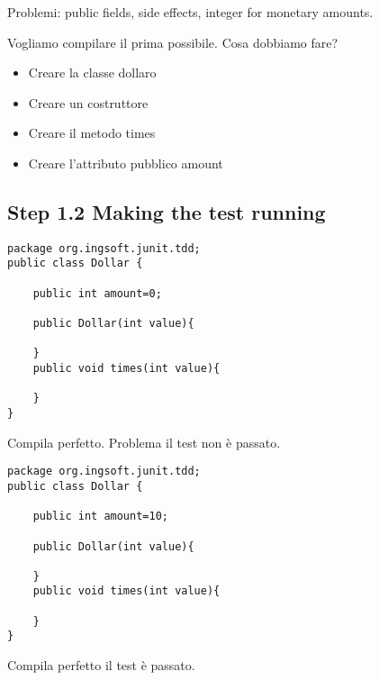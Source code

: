 \documentclass{article}
\begin{document}
Problemi: public fields, side effects, integer for monetary amounts.

Vogliamo compilare il prima possibile. Cosa dobbiamo fare?
\begin{itemize}
\item Creare la classe dollaro
\item Creare un costruttore
\item Creare il metodo times
\item Creare l'attributo pubblico  amount
\end{itemize}

\subsection {Step 1.2 Making the test running}
\begin{lstlisting}
package org.ingsoft.junit.tdd;
public class Dollar {
	
	public int amount=0;
	
	public Dollar(int value){
		
	}
	public void times(int value){
		
	}
}
\end{lstlisting}
Compila perfetto. Problema il test non \`e passato.

\begin{lstlisting}
package org.ingsoft.junit.tdd;
public class Dollar {
	
	public int amount=10;
	
	public Dollar(int value){
		
	}
	public void times(int value){
		
	}
}
\end{lstlisting}
Compila perfetto il test \`e passato.
\end{document}
